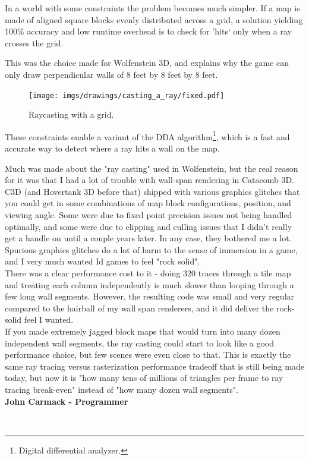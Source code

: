 In a world with some constraints the problem becomes much simpler. If a map is made of aligned square blocks evenly distributed across a grid, a solution yielding 100\% accuracy and low runtime overhead is to check for 'hits` only when a ray crosses the grid.\\
\par
 This was the choice made for Wolfenstein 3D, and explains why the game can only draw perpendicular walls of 8 feet by 8 feet by 8 feet.\\
\par
\begin{figure}[H]
\centering
\texttt{[image: imgs/drawings/casting\_a\_ray/fixed.pdf]}
 \caption{Raycasting with a grid.}
\end{figure}
\par
These constraints enable a variant of the DDA algorithm\footnote{Digital differential analyzer.}, which is a fast and accurate way to detect where a ray hits a wall on the map.
\par
\begin{fancyquotes}
\par
Much was made about the "ray casting" used in Wolfenstein, but the real reason for it was that I had a lot of trouble with wall-span rendering in Catacomb 3D.  C3D (and Hovertank 3D before that) shipped with various graphics glitches that you could get in some combinations of map block configurations, position, and viewing angle.  Some were due to fixed point precision issues not being handled optimally, and some were due to clipping and culling issues that I didn't really get a handle on until a couple years later.  In any case, they bothered me a lot.  Spurious graphics glitches do a lot of harm to the sense of immersion in a game, and I very much wanted Id games to feel "rock solid".
 \bigskip \\
There was a clear performance cost to it - doing 320 traces through a tile map and treating each column independently is much slower than looping through a few long wall segments.  However, the resulting code was small and very regular compared to the hairball of my wall span renderers, and it did deliver the rock-solid feel I wanted.
 \bigskip \\
If you made extremely jagged block maps that would turn into many dozen independent wall segments, the ray casting could start to look like a good performance choice, but few scenes were even close to that.  This is exactly the same ray tracing versus rasterization performance tradeoff that is still being made today, but now it is "how many tens of millions of triangles per frame to ray tracing break-even" instead of "how many dozen wall segments".
 \bigskip \\
\textbf{John Carmack - Programmer}
 \end{fancyquotes}\\
\par


